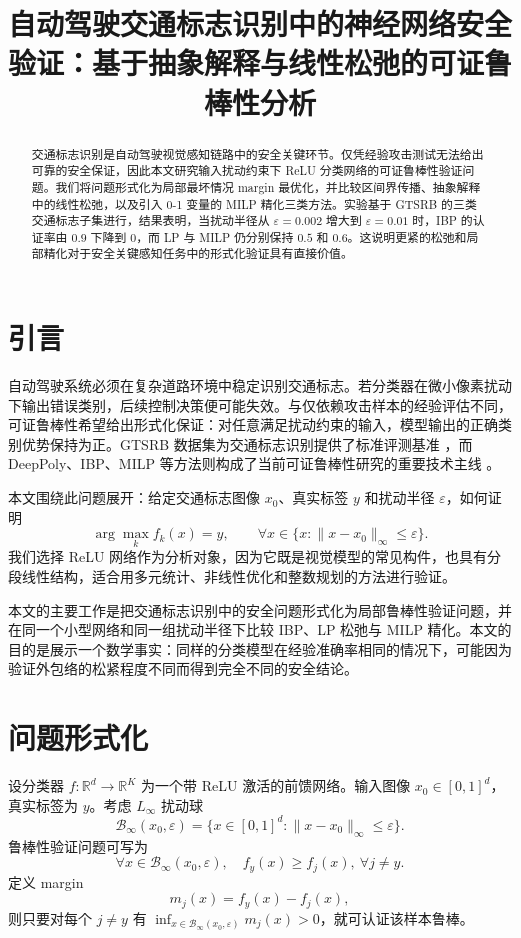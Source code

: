\documentclass[11pt,a4paper]{ctexart}
\title{自动驾驶交通标志识别中的神经网络安全验证：基于抽象解释与线性松弛的可证鲁棒性分析}
\author{}
\date{}
\newcommand{\R}{\mathbb{R}}
\newcommand{\B}{\mathcal{B}}
\begin{document}
\maketitle

\begin{abstract}
交通标志识别是自动驾驶视觉感知链路中的安全关键环节。仅凭经验攻击测试无法给出可靠的安全保证，因此本文研究输入扰动约束下 ReLU 分类网络的可证鲁棒性验证问题。我们将问题形式化为局部最坏情况 margin 最优化，并比较区间界传播、抽象解释中的线性松弛，以及引入 0-1 变量的 MILP 精化三类方法。实验基于 GTSRB 的三类交通标志子集进行，结果表明，当扰动半径从 $\varepsilon=0.002$ 增大到 $\varepsilon=0.01$ 时，IBP 的认证率由 $0.9$ 下降到 $0$，而 LP 与 MILP 仍分别保持 $0.5$ 和 $0.6$。这说明更紧的松弛和局部精化对于安全关键感知任务中的形式化验证具有直接价值。
\end{abstract}

\section{引言}
自动驾驶系统必须在复杂道路环境中稳定识别交通标志。若分类器在微小像素扰动下输出错误类别，后续控制决策便可能失效。与仅依赖攻击样本的经验评估不同，可证鲁棒性希望给出形式化保证：对任意满足扰动约束的输入，模型输出的正确类别优势保持为正。GTSRB 数据集为交通标志识别提供了标准评测基准 \cite{stallkamp2011gtsrb}，而 DeepPoly、IBP、MILP 等方法则构成了当前可证鲁棒性研究的重要技术主线 \cite{singh2019deeppoly,singh2019boosting,gowal2018ibp,tjeng2017mip}。

本文围绕此问题展开：给定交通标志图像 $x_0$、真实标签 $y$ 和扰动半径 $\varepsilon$，如何证明
\[
\arg\max_k f_k(x)=y,\qquad \forall x\in \{x:\|x-x_0\|_\infty\le \varepsilon\}.
\]
我们选择 ReLU 网络作为分析对象，因为它既是视觉模型的常见构件，也具有分段线性结构，适合用多元统计、非线性优化和整数规划的方法进行验证。

本文的主要工作是把交通标志识别中的安全问题形式化为局部鲁棒性验证问题，并在同一个小型网络和同一组扰动半径下比较 IBP、LP 松弛与 MILP 精化。本文的目的是展示一个数学事实：同样的分类模型在经验准确率相同的情况下，可能因为验证外包络的松紧程度不同而得到完全不同的安全结论。

\section{问题形式化}
设分类器 $f:\R^d\to \R^K$ 为一个带 ReLU 激活的前馈网络。输入图像 $x_0\in[0,1]^d$，真实标签为 $y$。考虑 $L_\infty$ 扰动球
\[
\B_\infty(x_0,\varepsilon)=\{x\in[0,1]^d:\|x-x_0\|_\infty\le \varepsilon\}.
\]
鲁棒性验证问题可写为
\[
\forall x\in \B_\infty(x_0,\varepsilon),\quad f_y(x)\ge f_j(x),\ \forall j\neq y.
\]
定义 margin
\[
m_j(x)=f_y(x)-f_j(x),
\]
则只要对每个 $j\neq y$ 有 $\inf_{x\in\B_\infty(x_0,\varepsilon)} m_j(x)>0$，就可认证该样本鲁棒。
\end{document}
